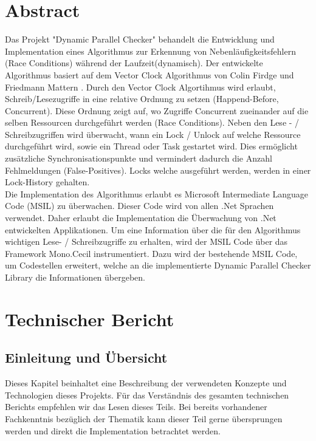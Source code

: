 \documentclass[10pt,a4paper]{article}
\begin{document}
\section{Abstract}
\begin{flushleft}
Das Projekt "Dynamic Parallel Checker" behandelt die Entwicklung und Implementation eines Algorithmus zur Erkennung von Nebenläufigkeitsfehlern (Race Conditions) während der Laufzeit(dynamisch). Der entwickelte Algorithmus basiert auf dem Vector Clock Algorithmus von Colin Firdge und Friedmann Mattern \cite{acsc}. Durch den Vector Clock Algortihmus wird erlaubt, Schreib/Lesezugriffe in eine relative Ordnung zu setzen (Happend-Before, Concurrent). Diese Ordnung zeigt auf, wo Zugriffe Concurrent zueinander auf die selben Ressourcen durchgeführt werden (Race Conditions). Neben den Lese - / Schreibzugriffen wird überwacht, wann ein Lock / Unlock auf welche Ressource durchgeführt wird, sowie ein Thread oder Task gestartet wird. Dies ermöglicht zusätzliche Synchronisationspunkte und vermindert dadurch die Anzahl Fehlmeldungen (False-Positives). Locks welche ausgeführt werden, werden in einer Lock-History gehalten.\\
Die Implementation des Algorithmus erlaubt es Microsoft Intermediate Language Code (MSIL) zu überwachen. Dieser Code wird von allen .Net Sprachen verwendet. Daher erlaubt die Implementation die Überwachung von .Net entwickelten Applikationen. Um eine Information über die für den Algorithmus wichtigen Lese- / Schreibzugriffe zu erhalten, wird der MSIL Code über das Framework Mono.Cecil instrumentiert. Dazu wird der bestehende MSIL Code, um Codestellen erweitert, welche an die implementierte Dynamic Parallel Checker Library die Informationen übergeben.
\end{flushleft}
\newpage
\section{Technischer Bericht}
\subsection{Einleitung und Übersicht}
Dieses Kapitel beinhaltet eine Beschreibung der verwendeten Konzepte und Technologien dieses Projekts. Für das Verständnis des gesamten technischen Berichts empfehlen wir das Lesen dieses Teils. Bei bereits vorhandener Fachkenntnis bezüglich der Thematik kann dieser Teil gerne übersprungen werden und direkt die Implementation betrachtet werden.
\end{document}
